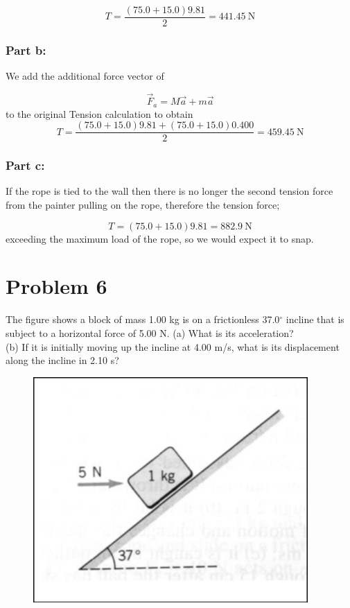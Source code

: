 \documentclass{article}
\begin{document}
\[
	T = \frac{\left( 75.0 + 15.0 \right)9.81}{2} = \boxed{441.45\ \text{N}}
\]

\subsubsection*{Part b:}
We add the additional force vector of

\[
	\vec{F}_a = M\vec{a} + m\vec{a}
\]
to the original Tension calculation to obtain
\[
	T = \frac{\left( 75.0 + 15.0 \right)9.81 + \left(75.0 + 15.0\right)0.400}{2} = \boxed{459.45\ \text{N}}
\]

\subsubsection*{Part c:}
If the rope is tied to the wall then there is no longer the second tension force from the painter pulling on the rope, therefore the tension force;

\[
	T = \left( 75.0 + 15.0 \right)9.81 = \boxed{882.9\ \text{N}}
\]
exceeding the maximum load of the rope, so we would expect it to snap.

\section*{Problem 6}
The figure shows a block of mass 1.00 kg is on a frictionless 37.0$^\circ$ incline that is subject to a horizontal force
of 5.00 N.
(a) What is its acceleration? \\
(b) If it is initially moving up the incline at 4.00 m/s, what is its displacement along the incline in 2.10 s?
\begin{figure}[ht]
    \centering
    \includegraphics[scale=.4]{drawing-4.png}
\end{figure}
\end{document}
